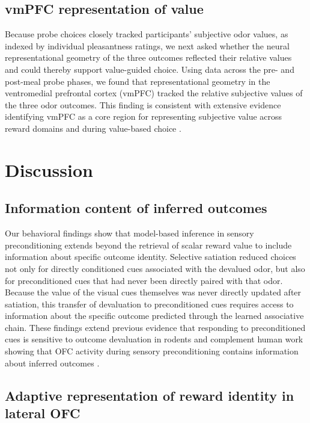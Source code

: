 \documentclass[12pt,letterpaper]{article}
\begin{document}
\subsection*{vmPFC representation of value}

Because probe choices closely tracked participants’ subjective odor values, as indexed by individual pleasantness ratings, we next asked whether the neural representational geometry of the three outcomes reflected their relative values and could thereby support value-guided choice. Using data across the pre- and post-meal probe phases, we found that representational geometry in the ventromedial prefrontal cortex (vmPFC) tracked the relative subjective values of the three odor outcomes. This finding is consistent with extensive evidence identifying vmPFC as a core region for representing subjective value across reward domains and during value-based choice \cite{levy2012root,bartra2013valuation}.


\section*{Discussion}



\subsection*{Information content of inferred outcomes}

Our behavioral findings show that model-based inference in sensory preconditioning extends beyond the retrieval of scalar reward value to include information about specific outcome identity. Selective satiation reduced choices not only for directly conditioned cues associated with the devalued odor, but also for preconditioned cues that had never been directly paired with that odor. Because the value of the visual cues themselves was never directly updated after satiation, this transfer of devaluation to preconditioned cues requires access to information about the specific outcome predicted through the learned associative chain. These findings extend previous evidence that responding to preconditioned cues is sensitive to outcome devaluation in rodents \cite{hart20} and complement human work showing that OFC activity during sensory preconditioning contains information about inferred outcomes \cite{wang2020interactions}.


\subsection*{Adaptive representation of reward identity in lateral OFC}
\end{document}
